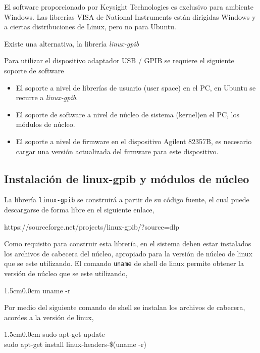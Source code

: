 \documentclass[paper=letter,oneside,fontsize=11pt, parskip=full]{scrartcl}
\newenvironment{code}
	{\begin{adjustwidth}{1.5cm}{0.0cm}\ttfamily}
	{\end{adjustwidth}}
\newenvironment{link}
	{\ttfamily}{}
\begin{document}
		El software proporcionado por Keysight Technologies es exclusivo para ambiente Windows. Las librerías VISA de National Instruments están dirigidas Windows y a ciertas distribuciones de Linux, pero no para Ubuntu.
		
		Existe una alternativa, la librería \emph{linux-gpib} 
		
		Para utilizar el dispositivo adaptador USB / GPIB se requiere el siguiente soporte de software
		
		\begin{itemize}
			\item El soporte a nivel de librerías de usuario (user space) en el PC, en Ubuntu se recurre a \emph{linux-gpib}.
			\item El soporte de software a nivel de núcleo de sistema (kernel)en el PC, los módulos de núcleo.
			\item El soporte a nivel de firmware en el dispositivo Agilent 82357B, es necesario cargar una versión actualizada del firmware para este dispositivo.
		\end{itemize}
	
		\subsection{Instalación de linux-gpib y módulos de núcleo}
		
		La librería \texttt{linux-gpib} se construirá a partir de su código fuente, el cual puede descargarse de forma libre en el siguiente enlace,
		
		\begin{link}
			https://sourceforge.net/projects/linux-gpib/?source=dlp
		\end{link}
		
		Como requisito para construir esta librería, en el sistema deben estar instalados los archivos de cabecera del núcleo, apropiado para la versión de núcleo de linux que se este utilizando. El comando \texttt{uname} de shell de linux permite obtener la versión de núcleo que se este utilizando,
		
		\begin{code}
			uname -r
		\end{code}
		
		Por medio del siguiente comando de shell se instalan los archivos de cabecera, acordes a la versión de linux,
		
		\begin{code}
			sudo apt-get update		\\
			sudo apt-get install linux-headers-\$(uname -r)
		\end{code}
		
\end{document}
